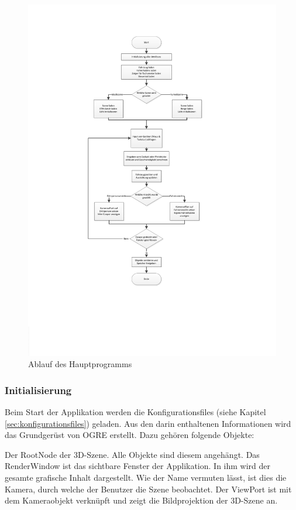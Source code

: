 
\begin{figure}[H]
\centering 
\includegraphics[width=0.6\linewidth]{src/flowchart_mainapplication.pdf}
\caption{Ablauf des Hauptprogramms} %
\label{ablauf_hauptprogramm} %
\end{figure}

\newpage

\subsubsection{Initialisierung}

Beim Start der Applikation werden die Konfigurationsfiles (siehe Kapitel \ref{sec:konfigurationsfiles}) geladen. Aus den darin enthaltenen Informationen wird das Grundgerüst von OGRE erstellt. Dazu gehören folgende Objekte:

Der RootNode der 3D-Szene. Alle Objekte sind diesem angehängt.
Das RenderWindow ist das sichtbare Fenster der Applikation. In ihm wird der gesamte grafische Inhalt dargestellt.
Wie der Name vermuten lässt, ist dies die Kamera, durch welche der Benutzer die Szene beobachtet.
Der ViewPort ist mit dem Kameraobjekt verknüpft und zeigt die Bildprojektion der 3D-Szene an. 

